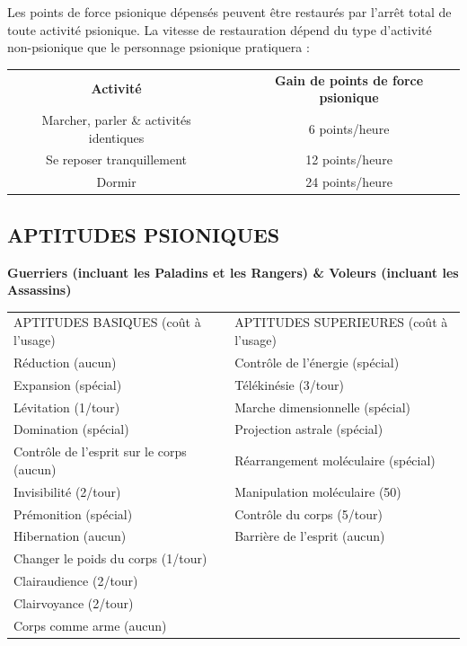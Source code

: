 \documentclass[11pt]{article}
\begin{document}
{Les points de force psionique dépensés peuvent être restaurés par l'arrêt total de toute activité psionique. La vitesse de restauration dépend du type d'activité non-psionique que le personnage psionique pratiquera :

\begin{center}
\begin{tabular}{cp{0.3cm}c}
\textbf{Activité} && \textbf{Gain de points de force psionique} \\
Marcher, parler \& activités identiques && 6 points/heure \\
Se reposer tranquillement && 12 points/heure \\
Dormir && 24 points/heure \\
\end{tabular}
\end{center}

\newpage
\subsection*{\normalsize APTITUDES PSIONIQUES}

\textbf{Guerriers (incluant les Paladins et les Rangers) \& Voleurs (incluant les Assassins)}

\bigskip

\begin{tabular}{p{7.5cm}p{0.3cm}p{7.5cm}}
APTITUDES BASIQUES (coût à l'usage) && APTITUDES SUPERIEURES (coût à l'usage) \\
Réduction (aucun) && Contrôle de l'énergie (spécial) \\
Expansion (spécial) && Télékinésie (3/tour) \\
Lévitation (1/tour) && Marche dimensionnelle (spécial) \\
Domination (spécial) && Projection astrale (spécial) \\
Contrôle de l'esprit sur le corps (aucun) && Réarrangement moléculaire (spécial) \\
Invisibilité (2/tour) && Manipulation moléculaire (50) \\
Prémonition (spécial) && Contrôle du corps (5/tour) \\
Hibernation (aucun) && Barrière de l'esprit (aucun) \\
Changer le poids du corps (1/tour) && \\
Clairaudience (2/tour) && \\
Clairvoyance (2/tour) && \\
Corps comme arme (aucun) && \\
\end{tabular}

}
\end{document}
